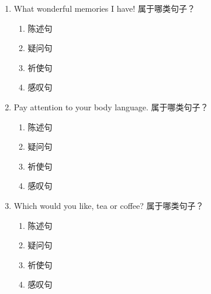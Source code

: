 \documentclass[11pt,a4paper]{ctexart}
\begin{document}
\begin{enumerate}[leftmargin=*,itemsep=4pt]
\begin{enumerate}[label=\Alph*.,leftmargin=2em,itemsep=1pt,topsep=2pt]
\item 祈使句
\item 感叹句
\end{enumerate}
\item What wonderful memories I have! 属于哪类句子？
\begin{enumerate}[label=\Alph*.,leftmargin=2em,itemsep=1pt,topsep=2pt]
\item 陈述句
\item 疑问句
\item 祈使句
\item 感叹句
\end{enumerate}
\item Pay attention to your body language. 属于哪类句子？
\begin{enumerate}[label=\Alph*.,leftmargin=2em,itemsep=1pt,topsep=2pt]
\item 陈述句
\item 疑问句
\item 祈使句
\item 感叹句
\end{enumerate}
\item Which would you like, tea or coffee? 属于哪类句子？
\begin{enumerate}[label=\Alph*.,leftmargin=2em,itemsep=1pt,topsep=2pt]
\item 陈述句
\item 疑问句
\item 祈使句
\item 感叹句
\end{enumerate}
\end{enumerate}
\end{document}
